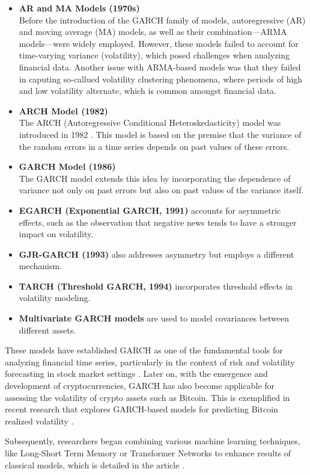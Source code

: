 \par
\begin{itemize}
\item \textbf{AR and MA Models (1970s)} \\
Before the introduction of the GARCH family of models, autoregressive (AR) and moving average (MA) models, as well as their combination—ARMA models—were widely employed. However, these models failed to account for time-varying variance (volatility), which posed challenges when analyzing financial data. Another issue with ARMA-based models was that they failed in caputing so-callued volatility clustering phenomena, where periods of high and low volatility alternate, which is common amongst financial data.

\item \textbf{ARCH Model (1982)} \\
The ARCH (Autoregressive Conditional Heteroskedasticity) model was introduced in 1982 \cite{RePEc:ecm:emetrp:v:50:y:1982:i:4:p:987-1007}. This model is based on the premise that the variance of the random errors in a time series depends on past values of these errors.

\item \textbf{GARCH Model (1986)} \cite{bollerslev1987} \\
The GARCH model extends this idea by incorporating the dependence of variance not only on past errors but also on past values of the variance itself.

\item \textbf{EGARCH (Exponential GARCH, 1991)} \cite{STPIERRE1998167} accounts for asymmetric effects, such as the observation that negative news tends to have a stronger impact on volatility.
\item \textbf{GJR-GARCH (1993)} also addresses asymmetry but employs a different mechanism.
\item \textbf{TARCH (Threshold GARCH, 1994)} \cite{RePEc:ids:ijecac:v:11:y:2022:i:2:p:199-211} incorporates threshold effects in volatility modeling.
\item \textbf{Multivariate GARCH models} \cite{Silvennoinen2009} are used to model covariances between different assets.
\end{itemize}

These models have established GARCH as one of the fundamental tools for analyzing financial time series, particularly in the context of risk and volatility forecasting in stock market settings \citep{10.1257/jep.15.4.157}. Later on, with the emergence and development of cryptocurrencies, GARCH has also become applicable for assessing the volatility of crypto assets such as Bitcoin. This is exemplified in recent research that explores GARCH-based models for predicting Bitcoin realized volatility \citep{jrfm10040017}.

Subsequently, researchers began combining various machine learning techniques, like Long-Short Term Memory \citep{lstm} or Transformer Networks \citep{tnn} to enhance results of classical models, which is detailed in the article \cite{AMIRSHAHI2023100465}.


